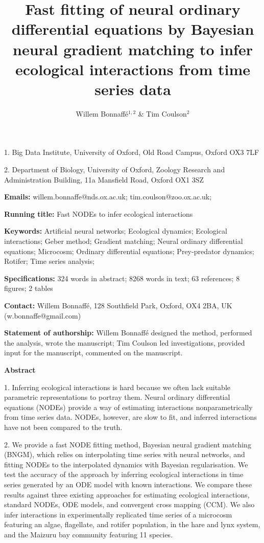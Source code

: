 \documentclass[11pt, oneside]{article}
\title{Fast fitting of neural ordinary differential equations by Bayesian neural gradient matching to infer ecological interactions from time series data}
\author{Willem Bonnaff\'e$^{1,2}$ \& Tim Coulson$^2$}
\date{}
\begin{document}
\maketitle
{}

1. Big Data Institute, University of Oxford, Old Road Campus, Oxford OX3 7LF 

2. Department of Biology, University of Oxford, Zoology Research and Administration Building, 11a Mansfield Road, Oxford OX1 3SZ 

\textbf{Emails:}
willem.bonnaffe@nds.ox.ac.uk;
tim.coulson@zoo.ox.ac.uk;

\textbf{Running title:}
Fast NODEs to infer ecological interactions

\textbf{Keywords:}
Artificial neural networks;
Ecological dynamics;  
Ecological interactions;
Geber method; 
Gradient matching;
Neural ordinary differential equations; 
Microcosm;
Ordinary differential equations; 
Prey-predator dynamics; 
Rotifer;
Time series analysis;

\textbf{Specifications:}  324 words in abstract; 8268 words in text; 63 references; 8 figures; 2 tables

\textbf{Contact:}
Willem Bonnaff\'e, 128 Southfield Park, Oxford, OX4 2BA, UK (w.bonnaffe@gmail.com)

\textbf{Statement of authorship:}
Willem Bonnaff\'e designed the method, performed the analysis, wrote the manuscript; 
Tim Coulson led investigations, provided input for the manuscript, commented on the manuscript.

\newpage
{}

\textbf{Abstract} 

1. Inferring ecological interactions is hard because we often lack suitable parametric representations to portray them.
Neural ordinary differential equations (NODEs) provide a way of estimating interactions nonparametrically from time series data. 
NODEs, however, are slow to fit, and inferred interactions have not been compared to the truth.

2. We provide a fast NODE fitting method, Bayesian neural gradient matching (BNGM), which relies on interpolating time series with neural networks, and fitting NODEs to the interpolated dynamics with Bayesian regularisation.
We test the accuracy of the approach by inferring ecological interactions in time series generated by an ODE model with known interactions. 
We compare these results against three existing approaches for estimating ecological interactions, standard NODEs, ODE models, and convergent cross mapping (CCM).
We also infer interactions in experimentally replicated time series of a microcosm featuring an algae, flagellate, and rotifer population, in the hare and lynx system, and the Maizuru bay community featuring 11 species.
\end{document}
